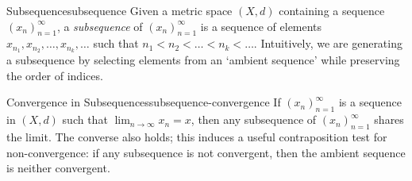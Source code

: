 \documentclass{article}
\numberwithin{equation}{section}
\numberwithin{figure}{section}
\begin{document}
\begin{definition}{Subsequence}{subsequence}
    Given a metric space $ (X, d) $ containing a sequence $
    \left(x_n\right)_{n=1}^\infty $, a \emph{subsequence} of $ \left( x_n
    \right)_{n=1}^\infty $ is a sequence of elements $ x_{n_1}, x_{n_2}, \ldots,
    x_{n_k}, \ldots $ such that $ n_1 < n_2 < \ldots < n_k < \ldots $.
    Intuitively, we are generating a subsequence by selecting elements from an
    `ambient sequence' while preserving the order of indices.

    \centering
\end{definition}
\begin{theorem}{Convergence in Subsequences}{subsequence-convergence}
    If $ \left( x_n \right)_{n=1}^\infty $ is a sequence in $ (X, d) $ such that
    $ \lim_{n \to \infty}{x_n} = x $, then any subsequence of $ \left( x_n
    \right)_{n=1}^\infty $ shares the limit. The converse also holds; this
    induces a useful contraposition test for non-convergence: if any subsequence
    is not convergent, then the ambient sequence is neither convergent.
\end{theorem}
\end{document}
